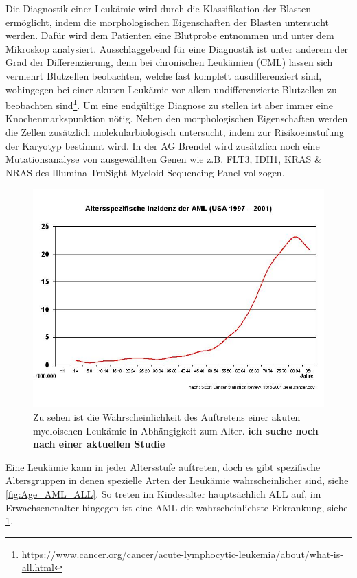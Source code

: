 Die Diagnostik einer Leukämie wird durch die Klassifikation der Blasten ermöglicht, indem die morphologischen Eigenschaften der Blasten untersucht werden. Dafür wird dem Patienten eine Blutprobe entnommen und unter dem Mikroskop analysiert. Ausschlaggebend für eine Diagnostik ist unter anderem der Grad der Differenzierung, denn bei chronischen Leukämien (CML) lassen sich vermehrt Blutzellen beobachten, welche fast komplett ausdifferenziert sind, wohingegen bei einer akuten Leukämie vor allem undifferenzierte Blutzellen zu beobachten sind\footnote{\url{https://www.cancer.org/cancer/acute-lymphocytic-leukemia/about/what-is-all.html}}. Um eine endgültige Diagnose zu stellen ist aber immer eine Knochenmarkspunktion nötig. Neben den morphologischen Eigenschaften werden die Zellen zusätzlich molekularbiologisch untersucht, indem zur Risikoeinstufung der Karyotyp bestimmt wird. In der AG Brendel wird zusätzlich noch eine Mutationsanalyse von ausgewählten Genen wie z.B. FLT3, IDH1, KRAS \& NRAS des Illumina TruSight Myeloid Sequencing Panel vollzogen.

\begin{figure}
\centering
\includegraphics[width=.95\textwidth]{images/Alter_AML_2001.jpg}
\caption{Zu sehen ist die Wahrscheinlichkeit des Auftretens einer akuten myeloischen Leukämie in Abhängigkeit zum Alter. \textbf{ich suche noch nach einer aktuellen Studie}}
\label{fig:Alter_AML}
\end{figure}
Eine Leukämie kann in jeder Altersstufe auftreten, doch es gibt spezifische Altersgruppen in denen spezielle Arten der Leukämie wahrscheinlicher sind, siehe \ref{fig:Age_AML_ALL}. So treten im Kindesalter hauptsächlich \ac{ALL} auf\cite{Rubnitz.2012}, im Erwachsenenalter hingegen ist eine \ac{AML} die wahrscheinlichste Erkrankung, siehe \ref{fig:Alter_AML}.

